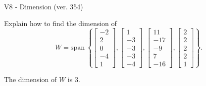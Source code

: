 \begin{exercise}
  \begin{exerciseTitle}V8 - Dimension (ver. 354)\end{exerciseTitle}
  \begin{exerciseStatement}
    Explain how to find the dimension of 
\[W=\mathrm{span}\ \left\{\left[\begin{array}{r}
-2 \\
2 \\
0 \\
-4 \\
1
\end{array}\right] , \left[\begin{array}{r}
1 \\
-3 \\
-3 \\
-3 \\
-4
\end{array}\right] , \left[\begin{array}{r}
11 \\
-17 \\
-9 \\
7 \\
-16
\end{array}\right] , \left[\begin{array}{r}
2 \\
2 \\
2 \\
2 \\
1
\end{array}\right]\right\}.\]



  \end{exerciseStatement}
  \begin{exerciseAnswer}
   The dimension of \(W\) is  \(3\).
  


  \end{exerciseAnswer}
\end{exercise}